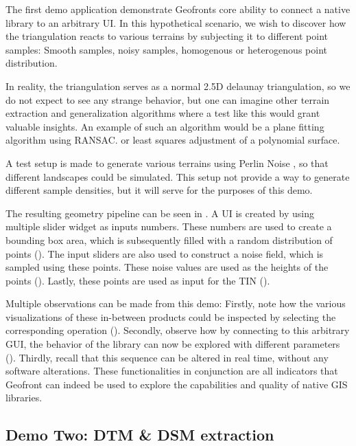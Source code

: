 The first demo application demonstrate Geofronts core ability to connect a native library to an arbitrary UI. 
In this hypothetical scenario, we wish to discover how the  triangulation reacts to various terrains by subjecting it to different point samples: Smooth samples, noisy samples, homogenous or heterogenous point distribution.

In reality, the  triangulation serves as a normal 2.5D delaunay triangulation, so we do not expect to see any strange behavior, but one can imagine other terrain extraction and generalization algorithms where a test like this would grant valuable insights.  
An example of such an algorithm would be a plane fitting algorithm using RANSAC. or least squares adjustment of a polynomial surface.

A test setup is made to generate various terrains using Perlin Noise \citep{perlin_improved_2002}, so that different landscapes could be simulated.
This setup not provide a way to generate different sample densities, but it will serve for the purposes of this demo.

The resulting geometry pipeline can be seen in . 
A UI is created by using multiple slider widget as inputs numbers.
These numbers are used to create a bounding box area, which is subsequently filled with a random distribution of points ().
The input sliders are also used to construct a noise field, which is sampled using these points. These noise values are used as the heights of the points ().
Lastly, these points are used as input for the \ac{TIN} ().

Multiple observations can be made from this demo:
Firstly, note how the various visualizations of these in-between products could be inspected by selecting the corresponding operation (). 
Secondly, observe how by connecting  to this arbitrary \ac{GUI}, the behavior of the library can now be explored with different parameters ().
Thirdly, recall that this sequence can be altered in real time, without any software alterations. 
These functionalities in conjunction are all indicators that Geofront can indeed be used to explore the capabilities and quality of native \ac{GIS} libraries.

\subsection{Demo Two: DTM \& DSM extraction}

